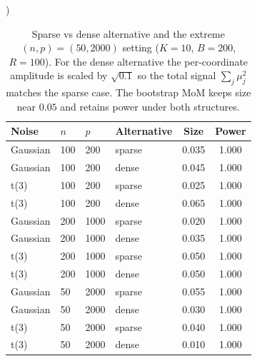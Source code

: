 \begin{table}[t]
\centering\small
\caption{Sparse vs dense alternative and the extreme $(n,p)=(50,2000)$ setting ($K=10$, $B=200$, $R=100$). For the dense alternative the per-coordinate amplitude is scaled by $\sqrt{0.1}$ so the total signal $\sum_j\mu_j^2$ matches the sparse case. The bootstrap MoM keeps size near $0.05$ and retains power under both structures.})
\label{tab:dense}
\begin{tabular}{llllcc}
\toprule
Noise & $n$ & $p$ & Alternative & Size & Power \\
\midrule
Gaussian & 100 & 200 & sparse & 0.035 & 1.000 \\
Gaussian & 100 & 200 & dense & 0.045 & 1.000 \\
t(3) & 100 & 200 & sparse & 0.025 & 1.000 \\
t(3) & 100 & 200 & dense & 0.065 & 1.000 \\
Gaussian & 200 & 1000 & sparse & 0.020 & 1.000 \\
Gaussian & 200 & 1000 & dense & 0.035 & 1.000 \\
t(3) & 200 & 1000 & sparse & 0.050 & 1.000 \\
t(3) & 200 & 1000 & dense & 0.050 & 1.000 \\
Gaussian & 50 & 2000 & sparse & 0.055 & 1.000 \\
Gaussian & 50 & 2000 & dense & 0.030 & 1.000 \\
t(3) & 50 & 2000 & sparse & 0.040 & 1.000 \\
t(3) & 50 & 2000 & dense & 0.010 & 1.000 \\
\bottomrule
\end{tabular}
\end{table}